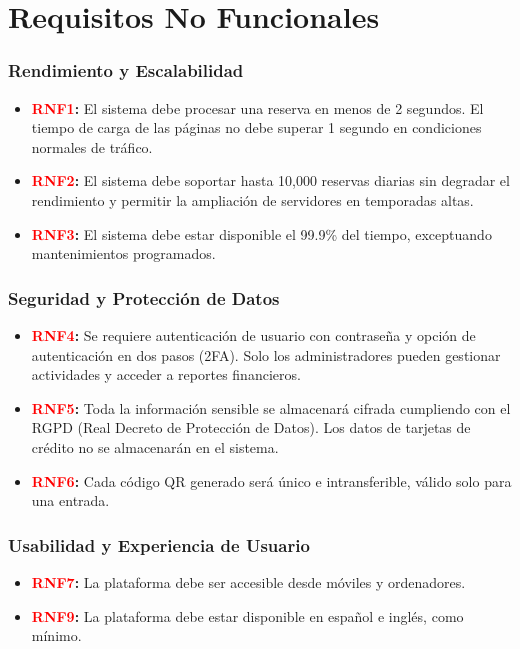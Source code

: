 \chapter{Requisitos No Funcionales}

% 

\subsection*{Rendimiento y Escalabilidad}
\begin{itemize}
    \item \textbf{\textcolor{red}{RNF1}:} El sistema debe procesar una reserva en menos de 2 segundos. El tiempo de carga de las páginas no debe superar 1 segundo en condiciones normales de tráfico.
    \item \textbf{\textcolor{red}{RNF2}:} El sistema debe soportar hasta 10,000 reservas diarias sin degradar el rendimiento y permitir la ampliación de servidores en temporadas altas.
    \item \textbf{\textcolor{red}{RNF3}:} El sistema debe estar disponible el 99.9\% del tiempo, exceptuando mantenimientos programados.
\end{itemize}

\subsection*{Seguridad y Protección de Datos}
\begin{itemize}
    \item \textbf{\textcolor{red}{RNF4}:} Se requiere autenticación de usuario con contraseña y opción de autenticación en dos pasos (2FA). Solo los administradores pueden gestionar actividades y acceder a reportes financieros.
    \item \textbf{\textcolor{red}{RNF5}:} Toda la información sensible se almacenará cifrada cumpliendo con el RGPD (Real Decreto de Protección de Datos). Los datos de tarjetas de crédito no se almacenarán en el sistema.
    \item \textbf{\textcolor{red}{RNF6}:} Cada código QR generado será único e intransferible, válido solo para una entrada.
\end{itemize}

\subsection*{Usabilidad y Experiencia de Usuario}
\begin{itemize}
    \item \textbf{\textcolor{red}{RNF7}:} La plataforma debe ser accesible desde móviles y ordenadores.
    \item \textbf{\textcolor{red}{RNF9}:} La plataforma debe estar disponible en español e inglés, como mínimo.
\end{itemize}

